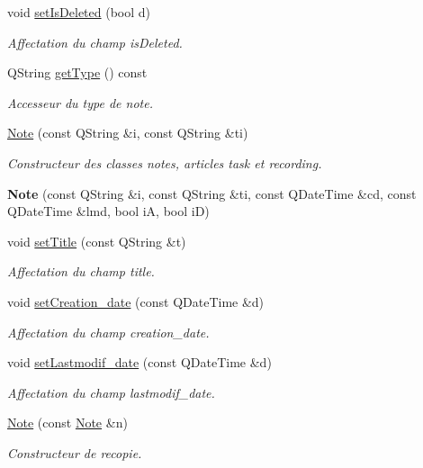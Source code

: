 \begin{DoxyCompactItemize}
void \hyperlink{class_note_a613e10e150caaeb73a24c342553e6c0e}{set\+Is\+Deleted} (bool d)
\begin{DoxyCompactList}\small\item\em Affectation du champ is\+Deleted. \end{DoxyCompactList}\item 
Q\+String \hyperlink{class_note_a342ef6ee08089d6b973e46c0bbfd8735}{get\+Type} () const
\begin{DoxyCompactList}\small\item\em Accesseur du type de note. \end{DoxyCompactList}\item 
\hyperlink{class_note_a0490153115307d5f59974d7000260e48}{Note} (const Q\+String \&i, const Q\+String \&ti)
\begin{DoxyCompactList}\small\item\em Constructeur des classes notes, articles task et recording. \end{DoxyCompactList}\item 
\mbox{\label{class_note_a0c1c2ba85358585f266b0fdcbcb45a70}} 
{\bfseries Note} (const Q\+String \&i, const Q\+String \&ti, const Q\+Date\+Time \&cd, const Q\+Date\+Time \&lmd, bool iA, bool iD)
\item 
void \hyperlink{class_note_ab1a8b5e69f3f23ed460f4761c9d4863d}{set\+Title} (const Q\+String \&t)
\begin{DoxyCompactList}\small\item\em Affectation du champ title. \end{DoxyCompactList}\item 
void \hyperlink{class_note_a8bc1e6842451f3b5099210b0ec18e48e}{set\+Creation\+\_\+date} (const Q\+Date\+Time \&d)
\begin{DoxyCompactList}\small\item\em Affectation du champ creation\+\_\+date. \end{DoxyCompactList}\item 
void \hyperlink{class_note_a763d4659a671cf77b610e65417d9ff13}{set\+Lastmodif\+\_\+date} (const Q\+Date\+Time \&d)
\begin{DoxyCompactList}\small\item\em Affectation du champ lastmodif\+\_\+date. \end{DoxyCompactList}\item 
\hyperlink{class_note_ac06fd282c05bbfe2e1675fe0677b2efb}{Note} (const \hyperlink{class_note}{Note} \&n)
\begin{DoxyCompactList}\small\item\em Constructeur de recopie. \end{DoxyCompactList}\item 

\end{DoxyCompactItemize}
